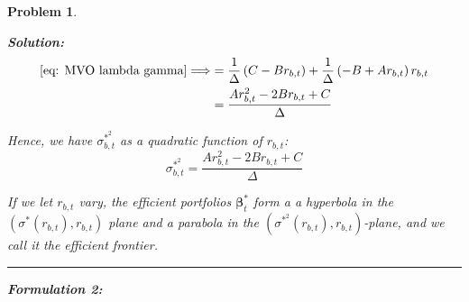 \documentclass[11pt]{article}
\theoremstyle{plain} %
\newtheorem{problem}[theorem]{Problem}
\newenvironment{solution}
{\color{C2}\normalfont\begin{framed}\begingroup\textbf{Solution:} }
  {\endgroup\end{framed}}
\theoremstyle{remark}
\begin{document}
\begin{problem}
\begin{enumerate}[label=(\alph*)]
\begin{solution}
\begin{align*}
            \cref{eq: MVO lambda gamma} \Longrightarrow & =\frac{1}{\Delta}\left(C-B r_{b, t}\right)+\frac{1}{\Delta}\left(-B+A r_{b, t}\right) r_{b, t}                                                                                                                                                                                                                                        \\
                                                        & =\frac{A r_{b, t}^2-2 B r_{b, t}+C}{\Delta}
          \end{align*}

          Hence, we have $\sigma_{b,t}^{*^2}$ as a quadratic function of $r_{b, t}$:
          $$
            \sigma_{b,t}^{*^2}=\frac{A r_{b, t}^2-2 B r_{b, t}+C}{\Delta}
          $$

          If we let $r_{b, t}$ vary, the efficient portfolios
          $\boldsymbol{\beta}_t^*$ form a a hyperbola in the
          $\left(\sigma^*\left(r_{b, t}\right), r_{b, t}\right)$ plane and a
          parabola in the $\left(\sigma^{*^2}\left(r_{b, t}\right), r_{b,
              t}\right)$-plane, and we call it the efficient frontier.
          \vspace*{0.5em}

          \hrule

          \textbf{Formulation 2:}


\end{solution}
\end{enumerate}
\end{problem}
\end{document}
